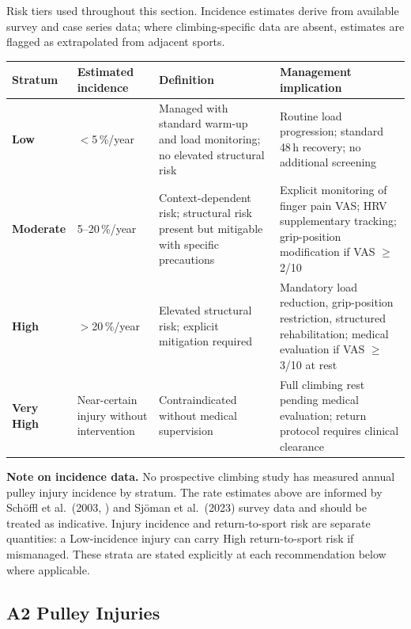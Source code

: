 Risk tiers used throughout this section. Incidence estimates derive from available survey and case series data; where climbing-specific data are absent, estimates are flagged as extrapolated from adjacent sports.

\renewcommand{\arraystretch}{1.3}
\begin{center}
\small
\begin{tabular}{>{\raggedright}p{2.4cm}
                >{\raggedright}p{3.0cm}
                >{\raggedright}p{4.0cm}
                >{\raggedright\arraybackslash}p{5.0cm}}
\toprule
\textbf{Stratum} & \textbf{Estimated incidence} & \textbf{Definition} & \textbf{Management implication} \\
\midrule
\textbf{Low} & $<$5\,\%/year & Managed with standard warm-up and load monitoring; no elevated structural risk & Routine load progression; standard 48\,h recovery; no additional screening \\
\addlinespace
\textbf{Moderate} & 5--20\,\%/year & Context-dependent risk; structural risk present but mitigable with specific precautions & Explicit monitoring of finger pain VAS; HRV supplementary tracking; grip-position modification if VAS $\geq$2/10 \\
\addlinespace
\textbf{High} & $>$20\,\%/year & Elevated structural risk; explicit mitigation required & Mandatory load reduction, grip-position restriction, structured rehabilitation; medical evaluation if VAS $\geq$3/10 at rest \\
\addlinespace
\textbf{Very High} & Near-certain injury without intervention & Contraindicated without medical supervision & Full climbing rest pending medical evaluation; return protocol requires clinical clearance \\
\bottomrule
\end{tabular}
\end{center}

\noindent\textbf{Note on incidence data.} No prospective climbing study has measured annual pulley injury incidence by stratum. The rate estimates above are informed by Sch\"{o}ffl et al.\ (2003, \cite{SHWS03}) and Sjöman et al.\ (2023) survey data and should be treated as indicative. Injury incidence and return-to-sport risk are separate quantities: a Low-incidence injury can carry High return-to-sport risk if mismanaged. These strata are stated explicitly at each recommendation below where applicable.

\subsection{A2 Pulley Injuries}
\label{subsec:a2pulley}

